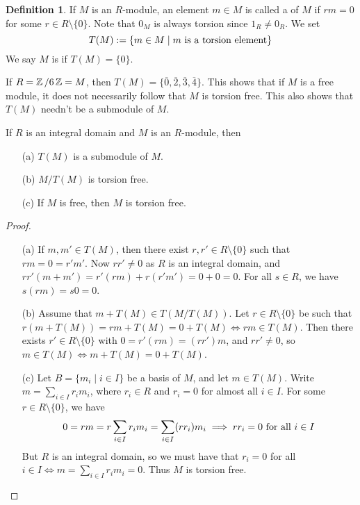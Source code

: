 \documentclass[11pt]{book}
\theoremstyle{definition}   \newtheorem{defn}[counter]{Definition} %
\newcommand{\ov}{\overline}   \newcommand{\wt}{\widetilde}
\newcommand{\bs}{\setminus}   \newcommand{\A}{\mathcal{A}}   \newcommand{\sy}{\textnormal{Syl}}   \newcommand{\size}[1]{\left| #1 \right|}
\newcommand{\vs}{\vspace{8pt}}   \newcommand{\hs}{\hspace{8pt}}
\numberwithin{counter}{chapter}
\begin{document}
\vs

\begin{defn}
If $M$ is an $R$-module, an element $m \in M$ is called a  of $M$ if $rm = 0$ for some $r \in R \bs \{0\}$. Note that $0_M$ is always torsion since $1_R \ne 0_R$. We set
	\[ T(M) := \{m \in M \mid m \textnormal{ is a torsion element} \} \]
We say $M$ is  if $T(M) = \{0\}$.
\end{defn}

\vs

\begin{example}
If $R = \operatorname{\mathbb{Z}}/6\operatorname{\mathbb{Z}} = M$, then $T(M) = \{\ov{0},\ov{2},\ov{3},\ov{4}\}$. This shows that if $M$ is a free module, it does not necessarily follow that $M$ is torsion free. This also shows that $T(M)$ needn't be a submodule of $M$.
\end{example}

\vs

\begin{lemma}
If $R$ is an integral domain and $M$ is an $R$-module, then
\begin{enumerate}
\item[(a)] $T(M)$ is a submodule of $M$.
\item[(b)] $M/T(M)$ is torsion free.
\item[(c)] If $M$ is free, then $M$ is torsion free.
\end{enumerate}
\end{lemma}

\vs

\begin{proof}\
\begin{enumerate}
\item[(a)] If $m,m' \in T(M)$, then there exist $r,r' \in R \bs \{0\}$ such that $rm = 0 = r'm'$. Now $rr' \ne 0$ as $R$ is an integral domain, and $rr'(m + m') = r'(rm) + r(r'm') = 0 + 0 = 0$. For all $s \in R$, we have $s(rm) = s 0 = 0$.

\item[(b)] Assume that $m + T(M) \in T(M/T(M))$. Let $r \in R \bs \{0\}$ be such that $r(m + T(M)) = rm + T(M) = 0 + T(M) \iff rm \in T(M)$. Then there exists $r' \in R \bs \{0\}$ with $0 = r'(rm) = (rr')m$, and $rr' \ne 0$, so $m \in T(M) \iff m + T(M) = 0 + T(M)$.

\item[(c)] Let $B = \{m_i \mid i \in I\}$ be a basis of $M$, and let $m \in T(M)$. Write $m = \sum_{i \in I} r_i m_i$, where $r_i \in R$ and $r_i = 0$ for almost all $i \in I$. For some $r \in R \bs \{0\}$, we have
	\[0 = rm = r \sum_{i \in I} r_i m_i = \sum_{i \in I} (rr_i) m_i \implies rr_i = 0 \textnormal{ for all } i \in I \]
But $R$ is an integral domain, so we must have that $r_i = 0$ for all $i \in I \iff m = \sum_{i \in I} r_i m_i = 0$. Thus $M$ is torsion free.
\end{enumerate}
\end{proof}
\end{document}
